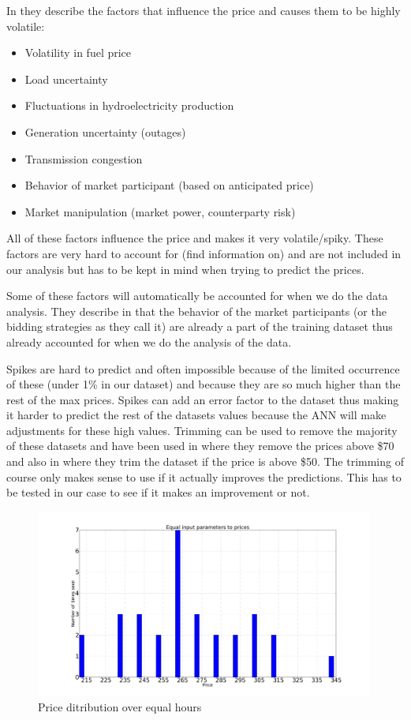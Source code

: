 In \cite{singhal2011electricity} they describe the factors that influence the price and causes them to be highly volatile:
\begin{itemize}
	\item Volatility in fuel price
 	\item Load uncertainty
 	\item Fluctuations in hydroelectricity production
 	\item Generation uncertainty (outages)
 	\item Transmission congestion
 	\item Behavior of market participant (based on anticipated price)
 	\item Market manipulation (market power, counterparty risk)
\end{itemize}
All of these factors influence the price and makes it very volatile/spiky. These factors are very hard to account for (find information on) and are not included in our analysis but has to be kept in mind when trying to predict the prices. 

Some of these factors will automatically be accounted for when we do the data analysis. They describe in \cite{yamin2004adaptive} that the behavior of the market participants (or the bidding strategies as they call it) are already a part of the training dataset thus already accounted for when we do the analysis of the data.

Spikes are hard to predict and often impossible because of the limited occurrence of these (under 1\% in our dataset) and because they are so much higher than the rest of the max prices. Spikes can add an error factor to the dataset thus making it harder to predict the rest of the datasets values because the ANN will make adjustments for these high values. Trimming can be used to remove the majority of these datasets and have been used in \cite{singhal2011electricity} where they remove the prices above \$70 and also in \cite{yamin2004adaptive} where they trim the dataset if the price is above \$50. The trimming of course only makes sense to use if it actually improves the predictions. This has to be tested in our case to see if it makes an improvement or not.

\begin{figure}[H]
\centering
\includegraphics[width=0.99\textwidth ]{billeder/energy_price_plots/same_hour_distribution.png}
\caption{Price ditribution over equal hours}
\label{fig:same_hour_distribution}
\end{figure}

